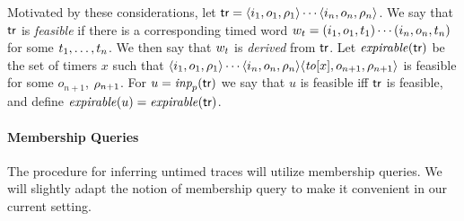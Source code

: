 
Motivated by these considerations,
let $\textsf{tr} = \langle i_1,o_1,\rho_1\rangle\cdots\langle i_n,o_n,\rho_n\rangle$.
We say that $\textsf{tr}$ is {\em feasible} if 
there is a corresponding timed word
$w_t = (i_1, o_1, t_1) \cdots (i_n, o_n, t_n)$ for some ${t}_1 , \ldots , {t}_{n}$.
We then say that $w_t$ is {\em derived} from $\textsf{tr}$.
Let $\mathit{expirable}(\textsf{tr})$ be the set of timers $x$ such that
$\langle i_1,o_1,\rho_1\rangle\cdots\langle i_n,o_n,\rho_n\rangle
\langle \mathit{to}[x],o_{n+1},\rho_{n+1}\rangle$
is feasible for some $o_{n+1}$, $\rho_{n+1}$.
For $u = \textit{inp}_p(\textsf{tr})$ we say that $u$ is feasible iff $\textsf{tr}$ is
feasible, and define $\mathit{expirable}(u) = \mathit{expirable}(\textsf{tr})$.


\paragraph{Membership Queries}
The procedure for inferring untimed traces will utilize membership queries.
We will slightly adapt the notion of membership query to make it convenient
in our current setting.

